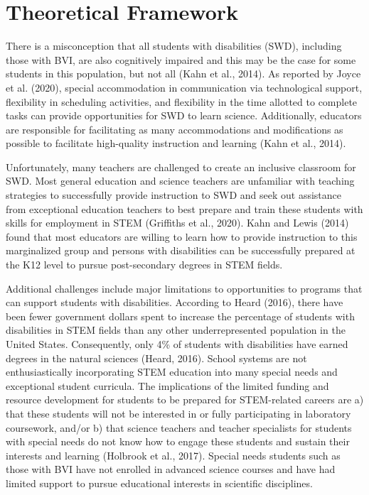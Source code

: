 \documentclass[11pt]{sig-alternate}
\begin{document}
\section*{Theoretical Framework}
\begin{large}

There is a misconception that all students with disabilities (SWD), including those with BVI, are also cognitively impaired and this may be the case for some students in this population, but not all (Kahn et al., 2014). As reported by Joyce et al. (2020), special accommodation in communication via technological support, flexibility in scheduling activities, and flexibility in the time allotted to complete tasks can provide opportunities for SWD to learn science. Additionally, educators are responsible for facilitating as many accommodations and modifications as possible to facilitate high-quality instruction and learning (Kahn et al., 2014).

Unfortunately, many teachers are challenged to create an inclusive classroom for SWD. Most general education and science teachers are unfamiliar with teaching strategies to successfully provide instruction to SWD and seek out assistance from exceptional education teachers to best prepare and train these students with skills for employment in STEM (Griffiths et al., 2020). Kahn and Lewis (2014) found that most educators are willing to learn how to provide instruction to this marginalized group and persons with disabilities can be successfully prepared at the K12 level to pursue post-secondary degrees in STEM fields. 
	
Additional challenges include major limitations to opportunities to programs that can support students with disabilities. According to Heard (2016), there have been fewer government dollars spent to increase the percentage of students with disabilities in STEM fields than any other underrepresented population in the United States. Consequently, only 4\% of students with disabilities have earned degrees in the natural sciences (Heard, 2016). School systems are not enthusiastically incorporating STEM education into many special needs and exceptional student curricula. The implications of the limited funding and resource development for students to be prepared for STEM-related careers are a) that these students will not be interested in or fully participating in laboratory coursework, and/or b) that science teachers and teacher specialists for students with special needs do not know how to engage these students and sustain their interests and learning (Holbrook et al., 2017). Special needs students such as those with BVI have not enrolled in advanced science courses and have had limited support to pursue educational interests in scientific disciplines. 


\end{large}
\end{document}
